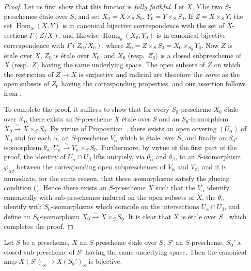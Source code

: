 \begin{proof}
Let us first show that this functor is \emph{fully faithful}.
Let $X$, $Y$ be two $S$-preschemes \'etale over $S$, and set $X_0=X\times_S S_0$, $Y_0=Y\times_S S_0$.
If $Z=X\times_S Y$, the set $\operatorname{Hom}_S(X,Y)$ is in canonical bijective correspondence with the set of $X$-sections $\Gamma(Z/X)$, and likewise $\operatorname{Hom}_{S_0}(X_0,Y_0)$ is in canonical bijective correspondence with $\Gamma(Z_0/X_0)$, where $Z_0=Z\times_S S_0=X_0\times_{S_0}Y_0$.
Now $Z$ is \'etale over $X$, $Z_0$ is \'etale over $X_0$, and $X_0$ (resp.\ $Z_0$) is a closed subprescheme of $X$ (resp.\ $Z$) having the same underlying space.  The open subsets of $Z$ on which the restriction of $Z\to X$ is surjective and radicial are therefore the \emph{same} as the open subsets of $Z_0$ having the corresponding properties, and our assertion follows from .

To complete the proof, it suffices to show that for every $S_0$-prescheme $X_0$ \'etale over $S_0$, there exists an $S$-prescheme $X$ \'etale over $S$ and an $S_0$-isomorphism $X_0\xrightarrow{\sim}X\times_S S_0$.
By virtue of Proposition~, there exists an open covering $(U_\alpha)$ of $X_0$ and for each $\alpha$, an $S$-prescheme $V_\alpha$ which is \'etale over $S$, and finally an $S_0$-isomorphism $\theta_\alpha:U_\alpha\xrightarrow{\sim}V_\alpha\times_S S_0$.
Furthermore, by virtue of the first part of the proof, the identity of $U_\alpha\cap U_\beta$ lifts uniquely, via $\theta_\alpha$ and $\theta_\beta$, to an $S$-isomorphism $\varphi_{\alpha\beta}$ between the corresponding open subpreschemes of $V_\alpha$ and $V_\beta$, and it is immediate, for the same reason, that these isomorphisms satisfy the glueing condition ().
Hence there exists an $S$-prescheme $X$ such that the $V_\alpha$ identify canonically with sub-preschemes induced on the open subsets of $X$, the $\theta_\alpha$ identify with $S_0$-isomorphisms which coincide on the intersections $U_\alpha\cap U_\beta$, and define an $S_0$-isomorphism $X_0\xrightarrow{\sim}X\times_S S_0$.
It is clear that $X$ is \'etale over $S$ , which completes the proof.
\end{proof}

\begin{corollary}[18.1.3]
\label{IV.18.1.3}
Let $S$ be a prescheme, $X$ an $S$-prescheme \'etale over $S$, $S'$ an $S$-prescheme, $S_0'$ a closed sub-prescheme of $S'$ having the same underlying space.
Then the canonical map $X(S')_S\to X(S_0')_S$  is bijective.
\end{corollary}


